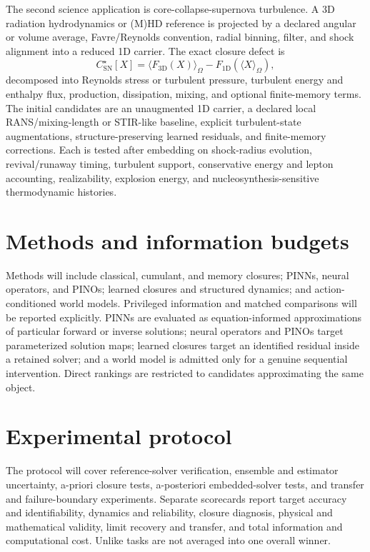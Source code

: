 \documentclass[11pt]{article}
\begin{document}
The second science application is core-collapse-supernova turbulence. A 3D
radiation hydrodynamics or (M)HD reference is projected by a declared angular
or volume average, Favre/Reynolds convention, radial binning, filter, and shock
alignment into a reduced 1D carrier. The exact closure defect is
\begin{equation}
  C_{\mathrm{SN}}^\star[X]
  =\langle F_{3\mathrm D}(X)\rangle_\Omega
  -F_{1\mathrm D}(\langle X\rangle_\Omega),
\end{equation}
decomposed into Reynolds stress or turbulent pressure, turbulent energy and
enthalpy flux, production, dissipation, mixing, and optional finite-memory
terms. The initial candidates are an unaugmented 1D carrier, a declared local
RANS/mixing-length or STIR-like baseline, explicit turbulent-state
augmentations, structure-preserving learned residuals, and finite-memory
corrections. Each is tested after embedding on shock-radius evolution,
revival/runaway timing, turbulent support, conservative energy and lepton
accounting, realizability, explosion energy, and nucleosynthesis-sensitive
thermodynamic histories.

\section{Methods and information budgets}
Methods will include classical, cumulant, and memory closures; PINNs, neural
operators, and PINOs; learned closures and structured dynamics; and
action-conditioned world models. Privileged information and matched
comparisons will be reported explicitly. PINNs are evaluated as
equation-informed approximations of particular forward or inverse solutions;
neural operators and PINOs target parameterized solution maps; learned
closures target an identified residual inside a retained solver; and a world
model is admitted only for a genuine sequential intervention. Direct rankings
are restricted to candidates approximating the same object.

\section{Experimental protocol}
The protocol will cover reference-solver verification, ensemble and estimator
uncertainty, a-priori closure tests, a-posteriori embedded-solver tests, and
transfer and failure-boundary experiments. Separate scorecards report target
accuracy and identifiability, dynamics and reliability, closure diagnosis,
physical and mathematical validity, limit recovery and transfer, and total
information and computational cost. Unlike tasks are not averaged into one
overall winner.
\end{document}
